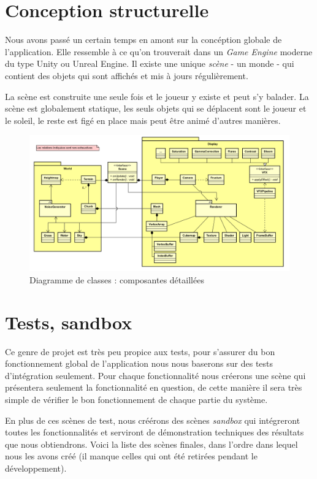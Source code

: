 \documentclass{EPUProjetDi}
\begin{document}
\section{Conception structurelle}

Nous avons passé un certain temps en amont sur la concéption globale de l'application. Elle ressemble à ce qu'on trouverait dans un \textit{Game Engine} moderne du type Unity ou Unreal Engine. Il existe une unique \textit{scène} - un monde - qui contient des objets qui sont affichés et mis à jours régulièrement.

La scène est construite une seule fois et le joueur y existe et peut s'y balader. La scène est globalement statique, les seuls objets qui se déplacent sont le joueur et le soleil, le reste est figé en place mais peut être animé d'autres manières.

\begin{figure}[ht]
	\centering
	\includegraphics[scale=.49]{detailed_structure_uml}
	\caption{Diagramme de classes : composantes détaillées}
\end{figure}

\section{Tests, sandbox}

Ce genre de projet est très peu propice aux tests, pour s'assurer du bon fonctionnement global de l'application nous nous baserons sur des tests d'intégration seulement. Pour chaque fonctionnalité nous créerons une scène qui présentera seulement la fonctionnalité en question, de cette manière il sera très simple de vérifier le bon fonctionnement de chaque partie du système.

En plus de ces scènes de test, nous créérons des scènes \textit{sandbox} qui intégreront toutes les fonctionnalités et serviront de démonstration techniques des résultats que nous obtiendrons. Voici la liste des scènes finales, dans l'ordre dans lequel nous les avons créé (il manque celles qui ont été retirées pendant le développement).
\end{document}
